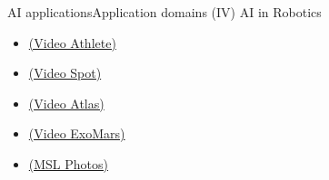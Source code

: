 \documentclass[10pt,compress]{beamer} %
\begin{document}
\begin{frame}{AI applications}{Application domains (IV)}
	AI in Robotics
	\begin{itemize}
		\item \href{http://www.youtube.com/watch?v=gDvoe091tk4}{(Video Athlete)}
		\item \href{https://www.youtube.com/watch?v=M8YjvHYbZ9w}{(Video Spot)}
		\item \href{https://www.youtube.com/watch?v=rVlhMGQgDkY}{(Video Atlas)}
		\item \href{https://www.youtube.com/watch?v=NhLi1LsNzno}{(Video ExoMars)}
		\item \href{http://www.jpl.nasa.gov/news/phoenix/multimedia.php}{(MSL Photos)}
	\end{itemize}
\end{frame}
\end{document}
